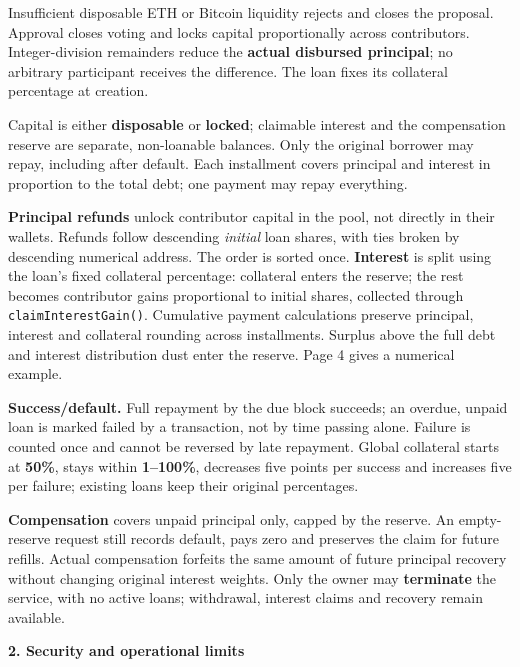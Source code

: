 \documentclass[10pt,a4paper]{article}
\newcommand{\entity}[1]{{\small\texttt{#1}}}
\newcommand{\pagetitle}[1]{{\fontsize{17}{20}\selectfont\bfseries\color{Navy}#1\par}\vspace{2mm}}
\newcommand{\subhead}[1]{\par\addvspace{2mm}{\fontsize{11.5}{14}\selectfont\bfseries\color{Navy}#1\par}\vspace{0.3mm}}
\begin{document}
Insufficient disposable ETH or Bitcoin liquidity rejects and closes the
proposal. Approval closes voting and locks capital proportionally across
contributors. Integer-division remainders reduce the \textbf{actual disbursed
principal}; no arbitrary participant receives the difference. The loan fixes
its collateral percentage at creation.

\subhead{Repayment, interest and compensation}
Capital is either \textbf{disposable} or \textbf{locked}; claimable interest and
the compensation reserve are separate, non-loanable balances. Only the original
borrower may repay, including after default. Each installment covers principal
and interest in proportion to the total debt; one payment may repay everything.

\textbf{Principal refunds} unlock contributor capital in the pool, not directly
in their wallets. Refunds follow descending \emph{initial} loan shares, with
ties broken by descending numerical address. The order is sorted once.
\textbf{Interest} is split using the loan's fixed collateral percentage:
collateral enters the reserve; the rest becomes contributor gains proportional
to initial shares, collected through \entity{claimInterestGain()}.
Cumulative payment calculations preserve principal, interest and collateral
rounding across installments. Surplus above the full debt and interest
distribution dust enter the reserve. Page 4 gives a numerical example.

\textbf{Success/default.} Full repayment by the due block succeeds; an overdue,
unpaid loan is marked failed by a transaction, not by time passing alone.
Failure is counted once and cannot be reversed by late repayment. Global
collateral starts at \textbf{50\%}, stays within \textbf{1--100\%}, decreases
five points per success and increases five per failure; existing loans keep
their original percentages.

\textbf{Compensation} covers unpaid principal only, capped by the reserve.
An empty-reserve request still records default, pays zero and preserves the
claim for future refills. Actual compensation forfeits the same amount of
future principal recovery without changing original interest weights.
Only the owner may \textbf{terminate} the service, with no active loans;
withdrawal, interest claims and recovery remain available.

\newpage
\pagetitle{2. Security and operational limits}
\end{document}
